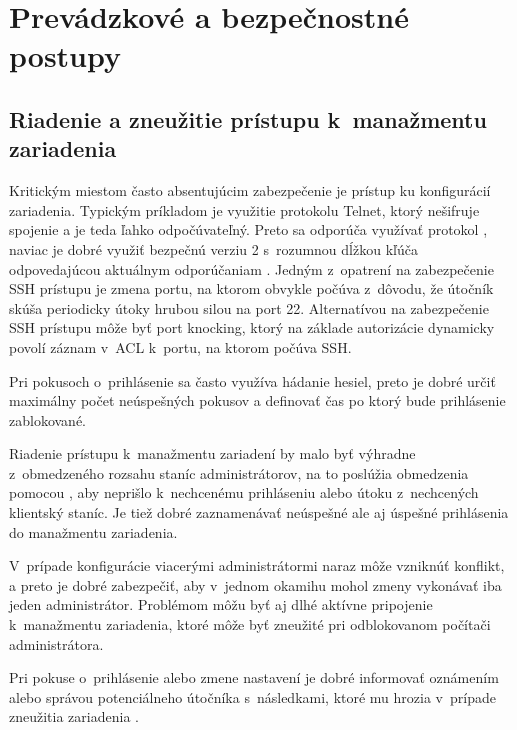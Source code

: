 \section{Prevádzkové a bezpečnostné postupy}

\subsection{Riadenie a zneužitie prístupu k~manažmentu zariadenia}
Kritickým miestom často absentujúcim zabezpečenie je prístup ku konfigurácií zariadenia. Typickým príkladom je využitie protokolu Telnet, ktorý nešifruje spojenie a je teda ľahko odpočúvateľný. Preto sa odporúča využívať protokol , naviac je dobré využiť bezpečnú verziu 2 s~rozumnou dĺžkou kľúča odpovedajúcou aktuálnym odporúčaniam \cite{CIS_DrTLsgXv24lxeIIM} \cite{Barker2019}. Jedným z~opatrení na zabezpečenie SSH prístupu je zmena portu, na ktorom obvykle počúva z~dôvodu, že útočník skúša periodicky útoky hrubou silou na  port 22. Alternatívou na zabezpečenie SSH prístupu môže byť port knocking, ktorý na základe autorizácie dynamicky povolí záznam v~ACL k~portu, na ktorom počúva SSH.

Pri pokusoch o~prihlásenie sa často využíva hádanie hesiel, preto je dobré určiť maximálny počet neúspešných pokusov a definovať čas po ktorý bude prihlásenie zablokované.

Riadenie prístupu k~manažmentu zariadení by malo byť výhradne z~obmedzeného rozsahu staníc administrátorov, na to poslúžia obmedzenia pomocou , aby neprišlo k~nechcenému prihláseniu alebo útoku  z~nechcených klientský staníc. Je tiež dobré zaznamenávať neúspešné ale aj úspešné prihlásenia do manažmentu zariadenia. 

V~prípade konfigurácie viacerými administrátormi naraz môže vzniknúť konflikt, a preto je dobré zabezpečiť, aby v~jednom okamihu mohol zmeny vykonávať iba jeden administrátor. Problémom môžu byť aj dlhé aktívne pripojenie k~manažmentu zariadenia, ktoré môže byť zneužité pri odblokovanom počítači administrátora. 

Pri pokuse o~prihlásenie alebo zmene nastavení je dobré informovať oznámením alebo správou potenciálneho útočníka s~následkami, ktoré mu hrozia v~prípade zneužitia zariadenia \cite{CIS_DrTLsgXv24lxeIIM}. 

